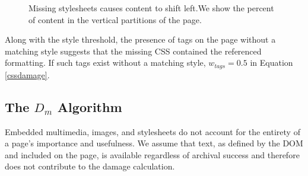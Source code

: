 \begin{figure}[h!]
  \begin{center}
    \qquad
  \end{center}
  \label{full}
  \caption{Missing stylesheets causes content to shift left.We show the percent of content in the vertical partitions of the page.}
\end{figure}


Along with the style threshold, the presence of tags on the page without a matching style suggests that the missing CSS contained the referenced formatting. If such tags exist without a matching style, $w_{tags}=0.5$ in Equation \ref{cssdamage}. 

\subsection{The $D_m$ Algorithm}
Embedded multimedia, images, and stylesheets do not account for the entirety of a page's importance and usefulness. We assume that text, as defined by the DOM and included on the page, is available regardless of archival success and therefore does not contribute to the damage calculation.


